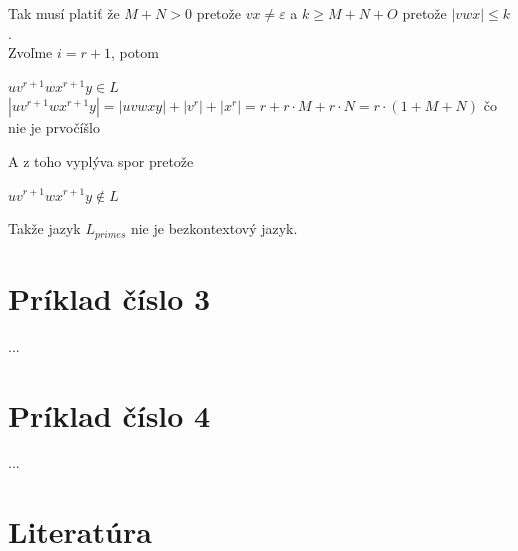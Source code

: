 \documentclass[11pt,a4paper]{article}
\begin{document}
Tak musí platiť že $M+N > 0$ pretože $vx \neq \varepsilon$ a $k \geq M+N+O$ pretože $|vwx| \leq k$.\\

Zvoľme $i=r+1$, potom

\begin{center}
$uv^{r+1}wx^{r+1}y \in L$\\[0.5em]
$|uv^{r+1}wx^{r+1}y| = |uvwxy| + |v^{r}| + |x^{r}| = r + r \cdot M + r \cdot N = r \cdot (1+M+N)$ čo nie je prvočíšlo\\
\end{center}

A z toho vyplýva spor pretože

\begin{center}
$uv^{r+1}wx^{r+1}y \notin L$
\end{center}

Takže jazyk $L_{primes}$ nie je bezkontextový jazyk.

\newpage
\section{Príklad číslo 3} %

...

\newpage
\section{Príklad číslo 4} %

...


\newpage
\section{Literatúra} %


\begin{flushleft}
    
\end{flushleft}
\end{document}
